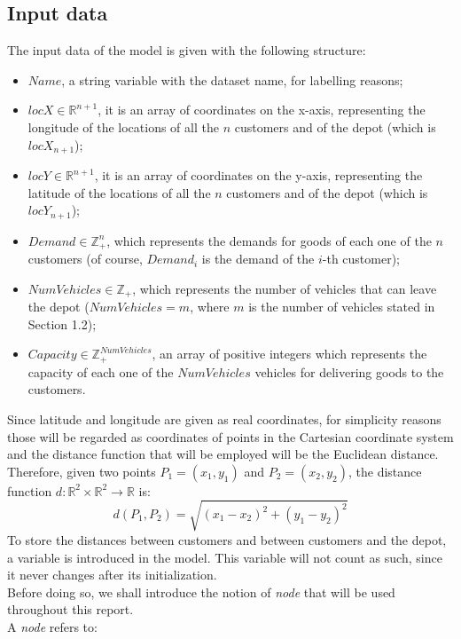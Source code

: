 \documentclass[../main.tex]{subfiles}
\begin{document}
\subsection{Input data}
\label{subsec:input-data}
The input data of the model is given with the following structure:
\begin{itemize}
    \item $Name$, a string variable with the dataset name, for labelling reasons;
    \item $locX \in \mathbb{R}^{n+1}$, it is an array of coordinates on the x-axis, representing the longitude of the locations of all the $n$ customers and of the depot (which is $locX_{n+1}$);
    \item $locY \in \mathbb{R}^{n+1}$, it is an array of coordinates on the y-axis, representing the latitude of the locations of all the $n$ customers and of the depot (which is $locY_{n+1}$);
    \item $Demand \in \mathbb{Z}_+^n$, which represents the demands for goods of each one of the $n$ customers (of course, $Demand_i$ is the demand of the $i$-th customer);
    \item $NumVehicles \in \mathbb{Z}_+$, which represents the number of vehicles that can leave the depot ($NumVehicles = m$, where $m$ is the number of vehicles stated in Section 1.2);
    \item $Capacity \in \mathbb{Z}_+^{NumVehicles}$, an array of positive integers which represents the capacity of each one of the $NumVehicles$ vehicles for delivering goods to the customers.
\end{itemize}
\noindent
Since latitude and longitude are given as real coordinates, for simplicity reasons those will be regarded as coordinates of points in the Cartesian coordinate system and the distance function that will be employed will be the Euclidean distance.\\
Therefore, given two points $P_1 = (x_1, y_1)$ and $P_2 = (x_2, y_2)$, the distance function $d: \mathbb{R}^2 \times \mathbb{R}^2 \rightarrow \mathbb{R}$ is: $$d(P_1, P_2) = \sqrt{(x_1 - x_2)^2+(y_1 - y_2)^2}$$
To store the distances between customers and between customers and the depot, a variable is introduced in the model. This variable will not count as such, since it never changes after its initialization.\\
Before doing so, we shall introduce the notion of \textit{node} that will be used throughout this report.\\
A \textit{node} refers to:
\end{document}
